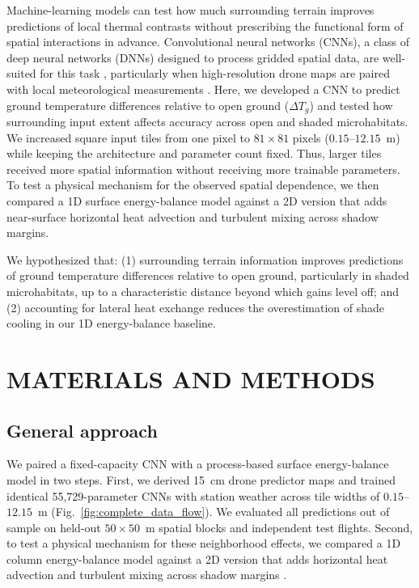 \documentclass[12pt]{article}
\begin{document}
Machine-learning models can test how much surrounding terrain improves predictions of local thermal contrasts without prescribing the functional form of spatial interactions in advance. Convolutional neural networks (CNNs), a class of deep neural networks (DNNs) designed to process gridded spatial data, are well-suited for this task \citep{lecun_2015, campsvalls_2025}, particularly when high-resolution drone maps are paired with local meteorological measurements \citep{slater_2023, levy_2024}. Here, we developed a CNN to predict ground temperature differences relative to open ground ($\Delta T_g$) and tested how surrounding input extent affects accuracy across open and shaded microhabitats. We increased square input tiles from one pixel to $81\times81$ pixels ($0.15$--$12.15$~m) while keeping the architecture and parameter count fixed. Thus, larger tiles received more spatial information without receiving more trainable parameters. To test a physical mechanism for the observed spatial dependence, we then compared a 1D surface energy-balance model \citep{Itzkovitch2025} against a 2D version that adds near-surface horizontal heat advection and turbulent mixing across shadow margins.

We hypothesized that: (1) surrounding terrain information improves predictions of ground temperature differences relative to open ground, particularly in shaded microhabitats, up to a characteristic distance beyond which gains level off; and (2) accounting for lateral heat exchange reduces the overestimation of shade cooling in our 1D energy-balance baseline.

\section{MATERIALS AND METHODS}
\subsection{General approach}
\noindent 
We paired a fixed-capacity CNN with a process-based surface energy-balance model in two steps. First, we derived 15~cm drone predictor maps and trained identical 55,729-parameter CNNs with station weather across tile widths of $0.15$--$12.15$~m (Fig.~\ref{fig:complete_data_flow}). We evaluated all predictions out of sample on held-out $50\times50$~m spatial blocks and independent test flights. Second, to test a physical mechanism for these neighborhood effects, we compared a 1D column energy-balance model against a 2D version that adds horizontal heat advection and turbulent mixing across shadow margins \citep{Itzkovitch2025}.
\end{document}

